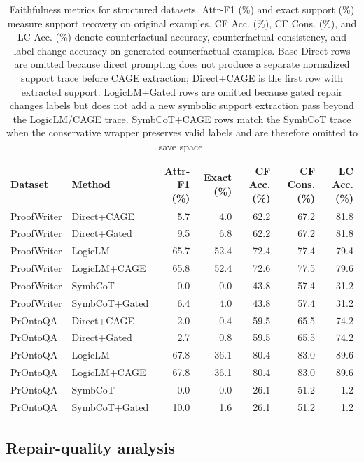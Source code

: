 \documentclass{article}
\begin{document}
\begin{table}[t]
\caption{Faithfulness metrics for structured datasets. Attr-F1 (\%) and exact support (\%) measure support recovery on original examples. CF Acc. (\%), CF Cons. (\%), and LC Acc. (\%) denote counterfactual accuracy, counterfactual consistency, and label-change accuracy on generated counterfactual examples. Base Direct rows are omitted because direct prompting does not produce a separate normalized support trace before CAGE extraction; Direct+CAGE is the first row with extracted support. LogicLM+Gated rows are omitted because gated repair changes labels but does not add a new symbolic support extraction pass beyond the LogicLM/CAGE trace. SymbCoT+CAGE rows match the SymbCoT trace when the conservative wrapper preserves valid labels and are therefore omitted to save space.}
\label{tab:faithfulness}
\centering
\vspace{0.5em}
\scriptsize
\begin{tabular}{llrrrrr}
\toprule
Dataset & Method & Attr-F1 (\%) & Exact (\%) & CF Acc. (\%) & CF Cons. (\%) & LC Acc. (\%) \\
\midrule
ProofWriter & Direct+CAGE & 5.7 & 4.0 & 62.2 & 67.2 & 81.8 \\
ProofWriter & Direct+Gated & 9.5 & 6.8 & 62.2 & 67.2 & 81.8 \\
ProofWriter & LogicLM & 65.7 & 52.4 & 72.4 & 77.4 & 79.4 \\
ProofWriter & LogicLM+CAGE & 65.8 & 52.4 & 72.6 & 77.5 & 79.6 \\
ProofWriter & SymbCoT & 0.0 & 0.0 & 43.8 & 57.4 & 31.2 \\
ProofWriter & SymbCoT+Gated & 6.4 & 4.0 & 43.8 & 57.4 & 31.2 \\
\midrule
PrOntoQA & Direct+CAGE & 2.0 & 0.4 & 59.5 & 65.5 & 74.2 \\
PrOntoQA & Direct+Gated & 2.7 & 0.8 & 59.5 & 65.5 & 74.2 \\
PrOntoQA & LogicLM & 67.8 & 36.1 & 80.4 & 83.0 & 89.6 \\
PrOntoQA & LogicLM+CAGE & 67.8 & 36.1 & 80.4 & 83.0 & 89.6 \\
PrOntoQA & SymbCoT & 0.0 & 0.0 & 26.1 & 51.2 & 1.2 \\
PrOntoQA & SymbCoT+Gated & 10.0 & 1.6 & 26.1 & 51.2 & 1.2 \\
\bottomrule
\end{tabular}
\end{table}

\subsection{Repair-quality analysis}
\label{sec:repair-quality}
\end{document}
